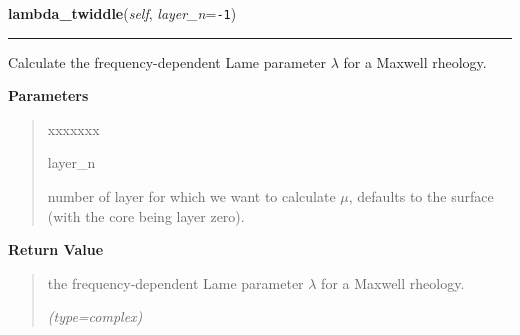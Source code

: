 \hspace{.8\funcindent}\begin{boxedminipage}{\funcwidth}

    \raggedright \textbf{lambda\_twiddle}(\textit{self}, \textit{layer\_n}={\tt -1})

    \vspace{-1.5ex}

    \rule{\textwidth}{0.5\fboxrule}
\setlength{\parskip}{2ex}
    Calculate the frequency-dependent Lame parameter \(\lambda\) for a 
    Maxwell rheology.

\setlength{\parskip}{1ex}
      \textbf{Parameters}
      \vspace{-1ex}

      \begin{quote}
        \begin{Ventry}{xxxxxxx}

          \item[layer\_n]

          number of layer for which we want to calculate \(\mu\), defaults 
          to the surface (with the core being layer zero).

        \end{Ventry}

      \end{quote}

      \textbf{Return Value}
    \vspace{-1ex}

      \begin{quote}
      the frequency-dependent Lame parameter \(\lambda\) for a Maxwell 
      rheology.

      {\it (type=complex)}

      \end{quote}

    \end{boxedminipage}

    \label{satstress:SatStress:StressDef:alpha}

    \vspace{0.5ex}

